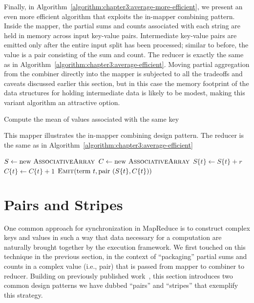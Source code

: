 Finally, in Algorithm~\ref{algorithm:chapter3:average-more-efficient}, we
present an even more efficient algorithm that exploits the in-mapper
combining pattern.  Inside the mapper, the partial sums and counts
associated with each string are held in memory across input key-value
pairs.  Intermediate key-value pairs are emitted only after the entire
input split has been processed; similar to before, the value is a pair
consisting of the sum and count.  The reducer is exactly the same as
in Algorithm~\ref{algorithm:chapter3:average-efficient}.  Moving partial
aggregation from the combiner directly into the mapper is subjected to
all the tradeoffs and caveats discussed earlier this section, but in
this case the memory footprint of the data structures for holding
intermediate data is likely to be modest, making this variant
algorithm an attractive option.

\begin{algorithm}[t]
\caption{Compute the mean of values associated with the same key}
\label{algorithm:chapter3:average-more-efficient}
This mapper illustrates the in-mapper combining design pattern. The
reducer is the same as in
Algorithm~\ref{algorithm:chapter3:average-efficient}

\algrenewcommand{}
\algrenewcommand{}
  \begin{algorithmic}[1]
      \State $S \gets \textrm{new }\textsc{AssociativeArray}$
      \State $C \gets \textrm{new }\textsc{AssociativeArray}$
    \EndProcedure
      \State $S\{t\} \gets S\{t\} + r$
      \State $C\{t\} \gets C\{t\} + 1$
    \EndProcedure
      \State $\textsc{Emit}(\textrm{term }t, \textrm{pair }(S\{t\}, C\{t\}))$
    \EndFor
    \EndProcedure
    \EndFunction
  \end{algorithmic}
\end{algorithm}

\section{Pairs and Stripes}
\label{chapter3:pairs-and-stripes}

One common approach for synchronization in MapReduce is to construct
complex keys and values in such a way that data necessary for a
computation are naturally brought together by the execution framework.
We first touched on this technique in the previous section, in the
context of ``packaging'' partial sums and counts in a complex value
(i.e., pair) that is passed from mapper to combiner to reducer.
Building on previously published
work~\cite{Dyer_etal_2008,Lin_EMNLP2008}, this section introduces two
common design patterns we have dubbed ``pairs'' and ``stripes'' that
exemplify this strategy.

